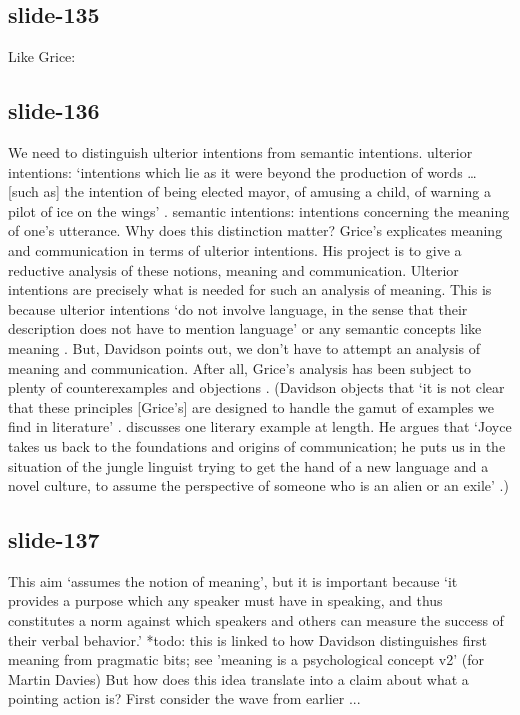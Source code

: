 \documentclass[12pt,\papersize]{extarticle}
\begin{document}
 
\subsection{slide-135}
Like Grice:
 
 
\subsection{slide-136}
We need to distinguish ulterior intentions from semantic intentions.
ulterior intentions: ‘intentions which lie as it were beyond the production of words … [such as] the intention of being elected mayor, of amusing a child, of warning a pilot of ice on the wings’ \citep[p.\ 298]{Davidson:1992pl}.
semantic intentions: intentions concerning the meaning of one’s utterance.
Why does this distinction matter?
Grice’s explicates meaning and communication in terms of ulterior intentions.
His project is to give a reductive analysis of these notions, meaning and communication.
Ulterior intentions are precisely what is needed for such an analysis of meaning.
This is because ulterior intentions ‘do not involve language, in the sense that their description does not have to mention language’ or any semantic concepts like meaning \citep[p.\ 298]{Davidson:1992pl}.
But, Davidson points out, we don’t have to attempt an analysis of meaning and communication.
After all, Grice’s analysis has been subject to plenty of counterexamples and objections \citep{Schiffer:1987zb}.
(Davidson objects that ‘it is not clear that these principles [Grice’s] are designed to handle the gamut of examples we find in literature’ \citep[p.\ 300]{Davidson:1992pl}.
\citet{Davidson:1991ic} discusses one literary example at length. He argues that ‘Joyce takes us back to the foundations and origins of communication; he puts us in the situation of the jungle linguist trying to get the hand of a new language and a novel culture, to assume the perspective of someone who is an alien or an exile’ \citep[p.\ 11]{Davidson:1991ic}.)
 
 
\subsection{slide-137}
This aim ‘assumes the notion of meaning’, but it is important because ‘it provides a purpose which any speaker must have in speaking, and thus constitutes a norm against which speakers and others can measure the success of their verbal behavior.’ \citep[p.\ 11]{Davidson:1994ol}
*todo: this is linked to how Davidson distinguishes first meaning from pragmatic bits; see 'meaning is a psychological concept v2' (for Martin Davies)
But how does this idea translate into a claim about what a pointing action is?
First consider the wave from earlier ...
 
\end{document}
